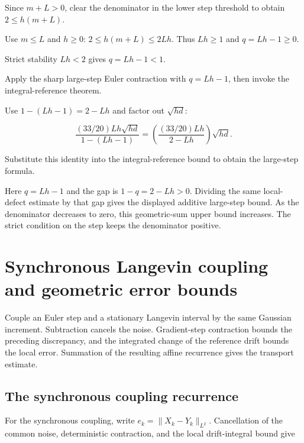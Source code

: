 \documentclass[11pt,a4paper]{article}
\begin{document}
Since \(m+L>0\), clear the denominator in the lower step threshold to obtain \(2\le h(m+L)\).



Use \(m\le L\) and \(h\ge0\): \(2\le h(m+L)\le2Lh\). Thus \(Lh\ge1\) and \(q=Lh-1\ge0\).



Strict stability \(Lh<2\) gives \(q=Lh-1<1\).



Apply the sharp large-step Euler contraction with \(q=Lh-1\), then invoke the integral-reference theorem.



Use \(1-(Lh-1)=2-Lh\) and factor out \(\sqrt{hd}\):

\[\frac{(33/20)Lh\sqrt{hd}}{1-(Lh-1)}=\left(\frac{(33/20)Lh}{2-Lh}\right)\sqrt{hd}.\]

Substitute this identity into the integral-reference bound to obtain the large-step formula.



Here \(q=Lh-1\) and the gap is \(1-q=2-Lh>0\). Dividing the same local-defect estimate by that gap gives the displayed additive large-step bound. As the denominator decreases to zero, this geometric-sum upper bound increases. The strict condition on the step keeps the denominator positive.


\section{\texorpdfstring{Synchronous Langevin coupling and geometric error bounds}{Synchronous Langevin coupling and geometric error bounds}}


Couple an Euler step and a stationary Langevin interval by the same Gaussian increment. Subtraction cancels the noise. Gradient-step contraction bounds the preceding discrepancy, and the integrated change of the reference drift bounds the local error. Summation of the resulting affine recurrence gives the transport estimate.



\subsection{\texorpdfstring{The synchronous coupling recurrence}{The synchronous coupling recurrence}}


For the synchronous coupling, write \(e_k=\|X_k-Y_k\|_{L^2}\). Cancellation of the common noise, deterministic contraction, and the local drift-integral bound give
\end{document}

